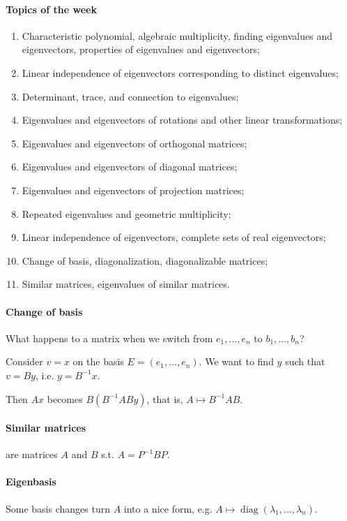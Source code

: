 \documentclass{article}
\begin{document}
\paragraph{Topics of the week} 

\begin{enumerate}
    \item Characteristic polynomial, algebraic multiplicity, finding eigenvalues and eigenvectors, properties of eigenvalues and eigenvectors;
    \item Linear independence of eigenvectors corresponding to distinct eigenvalues;
    \item Determinant, trace, and connection to eigenvalues;
    \item Eigenvalues and eigenvectors of rotations and other linear transformations;
    \item Eigenvalues and eigenvectors of orthogonal matrices;
    \item Eigenvalues and eigenvectors of diagonal matrices;
    \item Eigenvalues and eigenvectors of projection matrices;
    \item Repeated eigenvalues and geometric multiplicity;
    \item Linear independence of eigenvectors, complete sets of real eigenvectors;
    \item Change of basis, diagonalization, diagonalizable matrices;
    \item Similar matrices, eigenvalues of similar matrices.
\end{enumerate}

\paragraph{Change of basis} What happens to a matrix when we switch from $e_1,\dots,e_n$ to $b_1,\dots, b_n$?

Consider $v = x$ on the basis $E=(e_1,\dots,e_n)$. We want to find $y$ such that $v = By$, i.e. $y = B^{-1} x$.

Then $Ax$ becomes $B(B^{-1}ABy)$, that is, $A \mapsto B^{-1} A B$.

\paragraph{Similar matrices} are matrices $A$ and $B$ s.t. $A = P^{-1} BP$.

\paragraph{Eigenbasis} Some basis changes turn $A$ into a nice form, e.g. $A \mapsto \operatorname{diag}(\lambda_1,\dots,\lambda_n)$.
\end{document}
